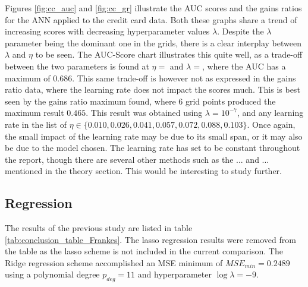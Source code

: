         Figures \ref{fig:cc_auc} and \ref{fig:cc_gr} illustrate the AUC scores and the gains ratios for the ANN applied to the credit card data. Both these graphs share a trend of increasing scores with decreasing hyperparameter values $\lambda$. Despite the $\lambda$ parameter being the dominant one in the grids, there is a clear interplay between $\lambda$ and $\eta$ to be seen. The AUC-Score chart illustrates this quite well, as a trade-off between the two parameters is found at $\eta=$ and $\lambda=$, where the AUC has a maximum of $0.686$. This same trade-off is however not as expressed in the gains ratio data, where the learning rate does not impact the scores much. This is best seen by the gains ratio maximum found, where 6 grid points produced the maximum result $0.465$. This result was obtained using $\lambda=10^{-7}$, and any learning rate in the list of $\eta \in \{ 0.010, 0.026, 0.041, 0.057, 0.072, 0.088, 0.103 \}$. Once again, the small impact of the learning rate may be due to its small span, or it may also be due to the model chosen. The learning rate has set to be constant throughout the report, though there are several other methods such as the ... and ... mentioned in the theory section. This would be interesting to study further.
            
            
    \subsection{Regression}
    	The results of the previous study are listed in table \ref{tab:conclusion_table_Frankes}. The lasso regression results were removed from the table as the lasso scheme is not included in the current comparison. The Ridge regression scheme accomplished an MSE minimum of $MSE_{min}=0.2489$ using a polynomial degree $p_{deg}=11$ and hyperparameter $\log\lambda=-9$. 
             
            
